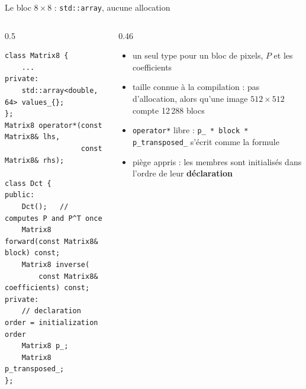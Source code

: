 \documentclass[aspectratio=169,10pt]{beamer}
\newcommand{\code}[1]{\texttt{#1}}
\begin{document}
\begin{frame}[fragile]{Le bloc \texorpdfstring{$8\times8$}{8x8} : \code{std::array}, aucune allocation}
  \begin{columns}[T]
    \begin{column}{0.5\textwidth}
\begin{lstlisting}
class Matrix8 {
    ...
private:
    std::array<double, 64> values_{};
};
Matrix8 operator*(const Matrix8& lhs,
                  const Matrix8& rhs);

class Dct {
public:
    Dct();   // computes P and P^T once
    Matrix8 forward(const Matrix8& block) const;
    Matrix8 inverse(
        const Matrix8& coefficients) const;
private:
    // declaration order = initialization order
    Matrix8 p_;
    Matrix8 p_transposed_;
};
\end{lstlisting}
    \end{column}
    \begin{column}{0.46\textwidth}
      \begin{itemize}
        \item un seul type pour un bloc de pixels, $P$ et les coefficients
        \item taille connue à la compilation : pas d'allocation, alors qu'une image $512\times512$
          compte 12\,288 blocs
        \item \code{operator*} libre : \code{p\_ * block * p\_transposed\_} s'écrit comme la formule
        \item piège appris : les membres sont initialisés dans l'ordre de leur \textbf{déclaration}
      \end{itemize}
    \end{column}
  \end{columns}
\end{frame}
\end{document}
